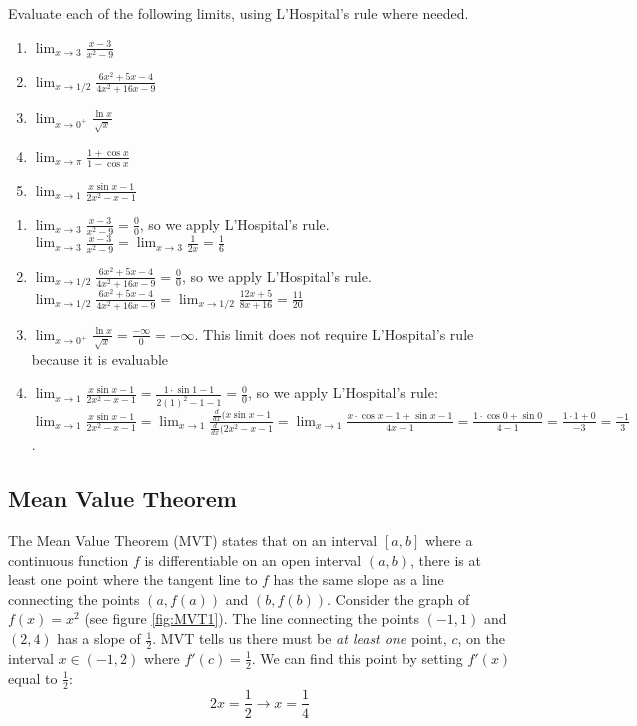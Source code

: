 \begin{Exercise}[label = LH2]
Evaluate each of the following limits, using L'Hospital's rule where needed.
\begin{enumerate}
\item $\lim_{x \to 3} \frac{x-3}{x^2-9}$
\item $\lim_{x \to 1/2} \frac{6x^2 + 5x - 4}{4x^2 + 16x - 9}$
\item $\lim_{x \to 0^+} \frac{\ln{x}}{\sqrt{x}}$
\item $\lim_{x \to \pi} \frac{1 + \cos{x}}{1 - \cos{x}}$
\item $\lim_{x \to 1} \frac{x\sin{x - 1}}{2x^2 - x - 1}$
\end{enumerate}
\end{Exercise}

\begin{Answer}[ref=LH2]
\begin{enumerate}
\item $\lim_{x \to 3} \frac{x-3}{x^2-9} = \frac{0}{0}$, so we apply L'Hospital's rule. $\lim_{x \to 3} \frac{x-3}{x^2-9} = \lim_{x \to 3} \frac{1}{2x} = \frac{1}{6}$
\item $\lim_{x \to 1/2} \frac{6x^2 + 5x - 4}{4x^2 + 16x - 9} = \frac{0}{0}$, so we apply L'Hospital's rule. $\lim_{x \to 1/2} \frac{6x^2 + 5x - 4}{4x^2 + 16x - 9} = \lim_{x \to 1/2} \frac{12x + 5}{8x + 16} = \frac{11}{20}$
\item $\lim_{x \to 0^+} \frac{\ln{x}}{\sqrt{x}} = \frac{-\infty}{0} = -\infty$. This limit does not require L'Hospital's rule because it is evaluable
\item $\lim_{x \to 1} \frac{x\sin{x - 1}}{2x^2 - x - 1} = \frac{1 \cdot \sin{1 - 1}}{2(1)^2 - 1 - 1} = \frac{0}{0}$, so we apply L'Hospital's rule: $\lim_{x \to 1} \frac{x\sin{x - 1}}{2x^2 - x - 1} = \lim_{x \to 1} \frac{\frac{d}{dx}(x\sin{x-1}}{\frac{d}{dx}(2x^2 - x - 1} = \lim_{x \to 1} \frac{x \cdot \cos{x - 1} + \sin{x - 1}}{4x - 1} = \frac{1 \cdot \cos{0} + \sin{0}}{4 - 1} = \frac{1 \cdot 1 + 0}{-3} = \frac{-1}{3}$. 
\end{enumerate}
\end{Answer}

\subsection{Mean Value Theorem}

The Mean Value Theorem (MVT) states that on an interval $[a, b]$ where a 
continuous function $f$ is differentiable on an open interval $(a, b)$, there 
is at least one point where the tangent line to $f$ has the same slope as a 
line connecting the points $(a, f(a))$ and $(b, f(b))$. Consider the graph of 
$f(x) = x^2$ (see figure \ref{fig:MVT1}). The line connecting the points 
$(-1, 1)$ and $(2, 4)$ has a slope of $\frac{1}{2}$. MVT tells us there must 
be \textit{at least one} point, $c$, on the interval $x \in (-1, 2)$ where 
$f'(c) = \frac{1}{2}$. We can find this point by setting $f'(x)$ equal to 
$\frac{1}{2}$: 
$$2x = \frac{1}{2} \rightarrow x = \frac{1}{4}$$

